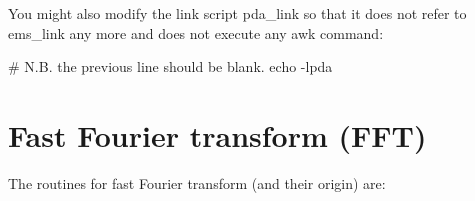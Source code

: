 \documentclass[11pt,twoside,nolof]{starlink}
\begin{document}
   You might also modify the link script pda\_link so that it does not
   refer to ems\_link any more and does not execute any awk command:

\begin{terminalv}

#  N.B. the previous line should be blank.
      echo -lpda
\end{terminalv}


\section{Fast Fourier transform (FFT)}

   The routines for fast Fourier transform (and their origin) are:
\end{document}
